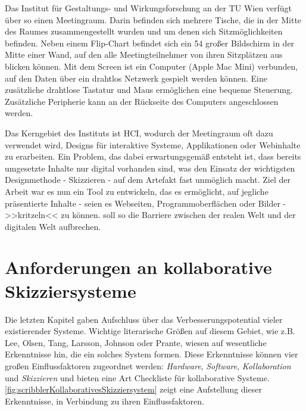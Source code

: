 \medskip Das Institut für Gestaltungs- und Wirkungsforschung an der TU Wien verfügt über so einen Meetingraum. Darin befinden sich mehrere Tische, die in der Mitte des Raumes zusammengestellt wurden und um denen sich Sitzmöglichkeiten befinden. Neben einem Flip-Chart befindet sich ein {54\dq} großer Bildschirm in der Mitte einer Wand, auf den alle Meetingteilnehmer von ihren Sitzplätzen aus blicken können. Mit dem Screen ist ein Computer (Apple Mac Mini) verbunden, auf den Daten über ein drahtlos Netzwerk gespielt werden können. Eine zusätzliche drahtlose Tastatur und Maus ermöglichen eine bequeme Steuerung. Zusätzliche Peripherie kann an der Rückseite des Computers angeschlossen werden.

\medskip Das Kerngebiet des Instituts ist \ac{HCI}, wodurch der Meetingraum oft dazu verwendet wird, Designs für interaktive Systeme, Applikationen oder Webinhalte zu erarbeiten. Ein Problem, das dabei erwartungsgemäß entsteht ist, dass bereits umgesetzte Inhalte nur digital vorhanden sind, was den Einsatz der wichtigsten Designmethode - Skizzieren - auf dem Artefakt fast unmöglich macht. Ziel der Arbeit war es nun ein Tool zu entwickeln, das es ermöglicht, auf jegliche präsentierte Inhalte - seien es Webseiten, Programmoberflächen oder Bilder - >>kritzeln<< zu können. \scribbler soll so die Barriere zwischen der realen Welt und der digitalen Welt aufbrechen.

\section{Anforderungen an kollaborative Skizziersysteme} \label{sec:anforderungen} 
Die letzten Kapitel gaben Aufschluss über das Verbesserungspotential vieler existierender Systeme. Wichtige literarische Größen auf diesem Gebiet, wie z.B. Lee, Olsen, Tang, Larsson, Johnson oder Prante, wiesen auf wesentliche Erkenntnisse hin, die ein solches System formen. Diese Erkenntnisse können vier großen Einflussfaktoren zugeordnet werden: \emph{Hardware}, \emph{Software}, \emph{Kollaboration} und \emph{Skizzieren} und bieten eine Art Checkliste für kollaborative Systeme. \autoref{fig:scribblerKollaborativesSkizziersystem} zeigt eine Aufstellung dieser Erkenntnisse, in Verbindung zu ihren Einflussfaktoren. 

